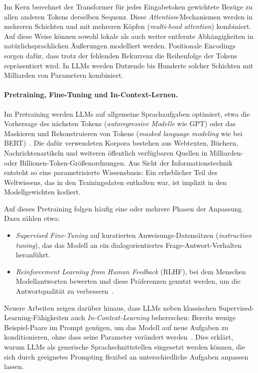 Im Kern berechnet der Transformer für jedes Eingabetoken gewichtete Bezüge zu allen anderen Tokens derselben Sequenz.
Diese \textit{Attention}-Mechanismen werden in mehreren Schichten und mit mehreren Köpfen (\textit{multi-head attention}) kombiniert.
Auf diese Weise können sowohl lokale als auch weiter entfernte Abhängigkeiten in natürlichsprachlichen Äußerungen modelliert werden.
Positionale Encodings sorgen dafür, dass trotz der fehlenden Rekurrenz die Reihenfolge der Tokens repräsentiert wird.
In LLMs werden Dutzende bis Hunderte solcher Schichten mit Milliarden von Parametern kombiniert.

\paragraph{Pretraining, Fine-Tuning und In-Context-Lernen.}

Im Pretraining werden LLMs auf allgemeine Sprachaufgaben optimiert, etwa die Vorhersage des nächsten Tokens (\textit{autoregressive Modelle} wie GPT) oder das Maskieren und Rekonstruieren von Tokens (\textit{masked language modeling} wie bei BERT)~\cite{devlin2019bert,brown2020language}.
Die dafür verwendeten Korpora bestehen aus Webtexten, Büchern, Nachrichtenartikeln und weiteren öffentlich verfügbaren Quellen in Milliarden- oder Billionen-Token-Größenordnungen.
Aus Sicht der Informationstechnik entsteht so eine parametrisierte Wissensbasis: Ein erheblicher Teil des Weltwissens, das in den Trainingsdaten enthalten war, ist implizit in den Modellgewichten kodiert.

Auf dieses Pretraining folgen häufig eine oder mehrere Phasen der Anpassung.
Dazu zählen etwa:
\begin{itemize}
    \item \textit{Supervised Fine-Tuning} auf kuratierten Anweisungs-Datensätzen (\textit{instruction tuning}), das das Modell an ein dialogorientiertes Frage-Antwort-Verhalten heranführt.
    \item \textit{Reinforcement Learning from Human Feedback} (RLHF), bei dem Menschen Modellantworten bewerten und diese Präferenzen genutzt werden, um die Antwortqualität zu verbessern~\cite{brown2020language}.
\end{itemize}

Neuere Arbeiten zeigen darüber hinaus, dass LLMs neben klassischen Supervised-Learning-Fähigkeiten auch \textit{In-Context-Learning} beherrschen: Bereits wenige Beispiel-Paare im Prompt genügen, um das Modell auf neue Aufgaben zu konditionieren, ohne dass seine Parameter verändert werden~\cite{brown2020language}.
Dies erklärt, warum LLMs als generische Sprachschnittstellen eingesetzt werden können, die sich durch geeignetes Prompting flexibel an unterschiedliche Aufgaben anpassen lassen.

